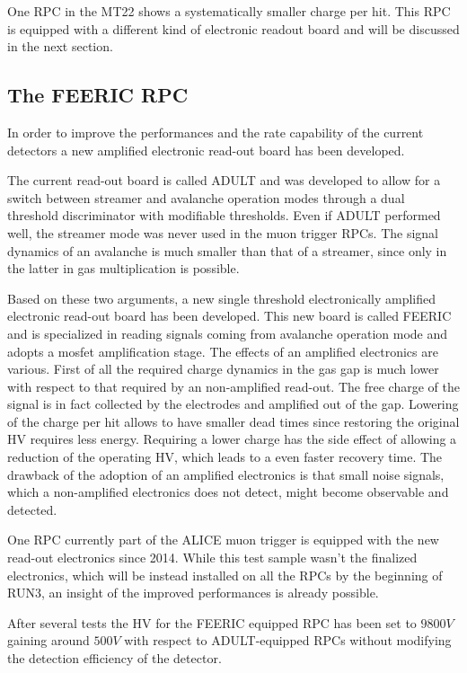 One RPC in the MT22 shows a systematically smaller charge per hit.
This RPC is equipped with a different kind of electronic readout board and will be discussed in the next section.

\subsection{The FEERIC RPC}
In order to improve the performances and the rate capability of the current detectors a new amplified electronic read-out board has been developed.

The current read-out board is called ADULT and was developed to allow for a switch between streamer and avalanche operation modes through a dual threshold discriminator with modifiable thresholds.
Even if ADULT performed well, the streamer mode was never used in the muon trigger RPCs.
The signal dynamics of an avalanche is much smaller than that of a streamer, since only in the latter in gas multiplication is possible.

Based on these two arguments, a new single threshold electronically amplified electronic read-out board has been developed.
This new board is called FEERIC and is specialized in reading signals coming from avalanche operation mode and adopts a mosfet amplification stage.
The effects of an amplified electronics are various.
First of all the required charge dynamics in the gas gap is much lower with respect to that required by an non-amplified read-out.
The free charge of the signal is in fact collected by the electrodes and amplified out of the gap.
Lowering of the charge per hit allows to have smaller dead times since restoring the original HV requires less energy.
Requiring a lower charge has the side effect of allowing a reduction of the operating HV, which leads to a even faster recovery time.
The drawback of the adoption of an amplified electronics is that small noise signals, which a non-amplified electronics does not detect, might become observable and detected.

One RPC currently part of the ALICE muon trigger is equipped with the new read-out electronics since 2014.
While this test sample wasn't the finalized electronics, which will be instead installed on all the RPCs by the beginning of RUN3, an insight of the improved performances is already possible.

After several tests the HV for the FEERIC equipped RPC has been set to $9800V$ gaining around $500V$ with respect to ADULT-equipped RPCs without modifying the detection efficiency of the detector.

